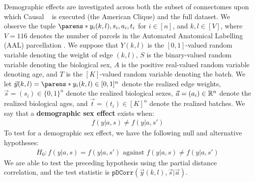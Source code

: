 Demographic effects are investigated across both the subset of connectomes upon which Causal \Combat~ is executed (the American Clique) and the full dataset. We observe the tuple $\parens*{y_{i}(k,l), s_i, a_i, t_i}$ for $i \in [n]$, and $k, l \in [V]$, where $V=116$ denotes the number of parcels in the Automated Anatomical Labelling (AAL) parcellation \cite{aal}. We suppose that $Y(k,l)$ is the $[0,1]$-valued random variable denoting the weight of edge $(k,l)$, $S$ is the binary-valued random variable denoting the biological sex, $A$ is the positive real-valued random variable denoting age, and $T$ is the $[K]$-valued random variable denoting the batch. We let $\vec y{(k,l)} = \parens*{y_{i}(k,l)} \in \mathcal [0,1]^n$ denote the realized edge weights, $\vec s = (s_i) \in \{0,1\}^n$ denote the realized biological sexes, $\vec a = (a_i) \in \mathbb{R}^n$ denote the realized biological ages, and $\vec t = (t_i) \in [K]^n$ denote the realized batches. We say that a \textbf{demographic sex effect} exists when:
\begin{align*}
    f(y | a, s) \neq f(y|a,s')
\end{align*}
To test for a demographic sex effect, we have the following null and alternative hypotheses:
\begin{align*}
    H_0: f(y | a, s) = f(y | a, s') \text{ against }f(y|a,s) \neq f(y|a,s')
\end{align*}
We are able to test the preceding hypothesis using the partial distance correlation, and the test statistic is $\texttt{pDCorr}(\vec y(k,l), \vec s | \vec a)$.




